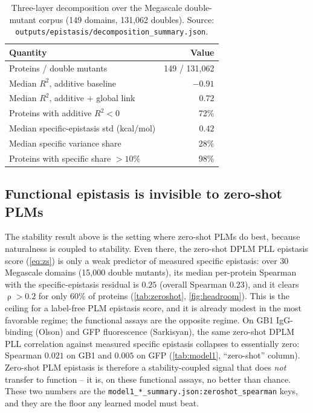 \documentclass{article}
\DeclareMathOperator{\spearman}{\rho}
\begin{document}
\begin{table}[t]
  \centering
  \caption{Three-layer decomposition over the Megascale double-mutant corpus
  (149 domains, 131{,}062 doubles). Source:
  \texttt{outputs/epistasis/decomposition\_summary.json}.}
  \label{tab:decomp}
  \small
  \setlength{\tabcolsep}{4pt}
  \begin{tabular}{lr}
    \toprule
    Quantity & Value \\
    \midrule
    Proteins / double mutants & 149 / 131{,}062 \\
    Median $R^2$, additive baseline & $-0.91$ \\
    Median $R^2$, additive $+$ global link & $0.72$ \\
    Proteins with additive $R^2 < 0$ & 72\% \\
    Median specific-epistasis std (kcal/mol) & $0.42$ \\
    Median specific variance share & 28\% \\
    Proteins with specific share $> 10\%$ & 98\% \\
    \bottomrule
  \end{tabular}
\end{table}

\subsection{Functional epistasis is invisible to zero-shot PLMs}
\label{sec:results-zs}

The stability result above is the setting where zero-shot PLMs do best, because
naturalness is coupled to stability. Even there, the zero-shot DPLM PLL epistasis
score (\cref{eq:zs}) is only a weak predictor of measured specific epistasis: over
30 Megascale domains (15{,}000 double mutants), its median per-protein Spearman
with the specific-epistasis residual is $0.25$ (overall Spearman $0.23$), and it
clears $\spearman > 0.2$ for only 60\% of proteins (\cref{tab:zeroshot},
\cref{fig:headroom}). This is
the ceiling for a label-free PLM epistasis score, and it is already modest in the
most favorable regime; the functional assays are the opposite regime. On GB1
IgG-binding (Olson) and GFP fluorescence (Sarkisyan), the same zero-shot DPLM PLL
correlation against measured specific epistasis collapses to essentially zero:
Spearman $0.021$ on GB1 and $0.005$ on GFP (\cref{tab:model1}, ``zero-shot''
column). Zero-shot PLM epistasis is therefore a stability-coupled signal that does
\emph{not} transfer to function -- it is, on these functional assays, no better
than chance. These two numbers are the
\texttt{model1\_*\_summary.json:zeroshot\_spearman} keys, and they
are the floor any learned model must beat.
\end{document}
